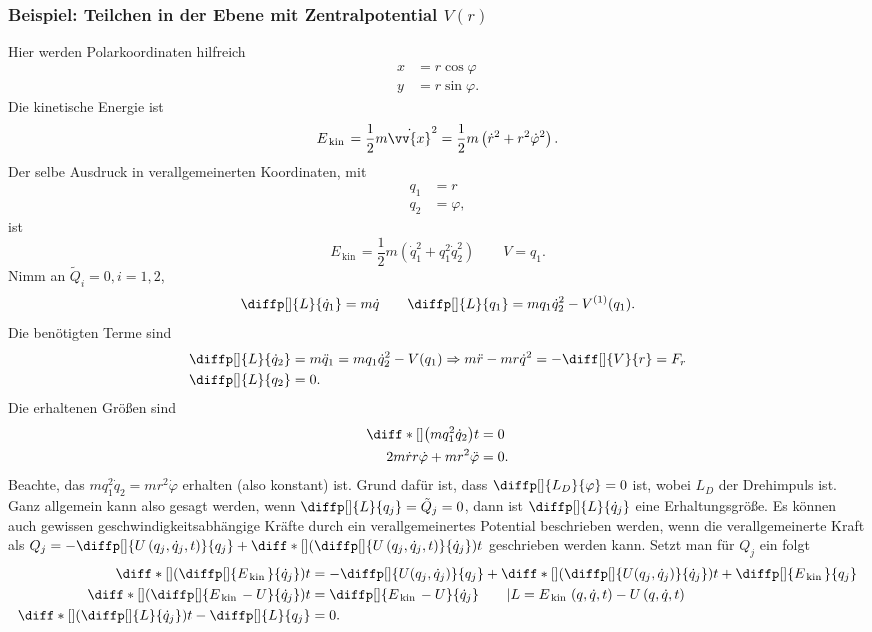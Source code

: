 \documentclass[a4paper,12pt]{article}
\numberwithin{equation}{section}
\begin{document}
\subsubsection{Beispiel: Teilchen in der Ebene mit Zentralpotential $V(r)$}
Hier werden Polarkoordinaten hilfreich
\begin{align*}
        x&=r\cos \varphi \\
        y&=r\sin \varphi 
.\end{align*}
Die kinetische Energie ist
\[ 
        E_{\,\text{kin}\,}=\dfrac{1}{2}m\dot{\vv{x}}^2=\dfrac{1}{2}m\left(\dot{r}^2+r^2\dot{\varphi }^2\right)
.\] 
Der selbe Ausdruck in verallgemeinerten Koordinaten, mit
\begin{align*}
        q_1&=r\\q_2&=\varphi 
,\end{align*}
ist
\[ 
        E_{\,\text{kin}\,}=\dfrac{1}{2}m\left(\dot{q}_1^2+q_1^2\dot{q}_2^2\right)\qquad V=q_1
.\] 
Nimm an $\tilde Q_i=0,i=1,2$,
\[ 
        \diffp[]{L}{\dot{q}_1}=m\dot{q}\qquad \diffp[]{L}{q_1}=mq_1\dot{q}_2^2-V^{(1)}(q_1)
.\] 
Die benötigten Terme sind
\begin{align*}
        \diffp[]{L}{\dot{q}_2}&=m\ddot{q}_1=mq_1\dot{q}_2^2-V(q_1)\Rightarrow m\ddot{r}-mr\dot{q}^2=-\diff[]{V}{r}=F_r\\
        \diffp[]{L}{q_2}&=0
.\end{align*}
Die erhaltenen Größen sind
\begin{align*}
        \diff*[]{\left(mq_1^2\dot{q}_2\right)}{t}&=0\\
        2m\dot{r}r\dot{\varphi }+mr^2\ddot{\varphi }&=0
.\end{align*}
Beachte, das $mq_1^2\dot{q}_2=mr^2\dot{\varphi }$ erhalten (also konstant) ist. Grund dafür ist, dass $\diffp[]{L_D}{\varphi }=0$ ist, wobei $L_D$ der Drehimpuls ist. Ganz allgemein kann also gesagt werden, wenn $\diffp[]{L}{q_j}=\tilde Q_j=0$, dann ist $\diffp[]{L}{\dot{q}_j}$ eine Erhaltungsgröße. Es können auch gewissen geschwindigkeitsabhängige Kräfte durch ein verallgemeinertes Potential beschrieben werden, wenn die verallgemeinerte Kraft als $Q_j=-\diffp[]{U\left(q_j,\dot{q}_j,t\right)}{q_j}+\diff*[]{\left(\diffp[]{U\left(q_j,\dot{q}_j,t\right)}{\dot{q}_j}\right)}{t}$ geschrieben werden kann. Setzt man für $Q_j$ ein folgt
\begin{align*}
        \diff*[]{\left(\diffp[]{E_{\,\text{kin}\,}}{\dot{q}_j}\right)}{t}&=-\diffp[]{U(q_j,\dot{q}_j)}{q_j}+\diff*[]{\left(\diffp[]{U(q_j,\dot{q}_j)}{\dot{q}_j}\right)}{t}+\diffp[]{E_{\,\text{kin}\,}}{q_j}\\
        \diff*[]{\left(\diffp[]{E_{\,\text{kin}\,}-U}{\dot{q}_j}\right)}{t}&=\diffp[]{E_{\,\text{kin}\,}-U}{\dot{q}_j}\qquad |L=E_{\,\text{kin}\,}\left(q,\dot{q},t\right)-U\left(q,\dot{q},t\right)\\
        \diff*[]{\left(\diffp[]{L}{\dot{q}_j}\right)}{t}-\diffp[]{L}{q_j}&=0
.\end{align*}
\end{document}
